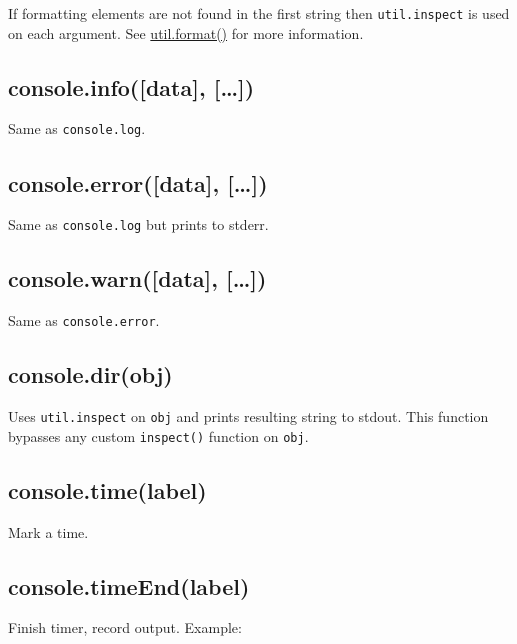 If formatting elements are not found in the first string then
\texttt{util.inspect} is used on each argument. See
\href{util.html\#util_util_format_format}{util.format()} for more
information.

\subsection{console.info({[}data{]},
{[}\ldots{}{]})}\label{console.infodata}

Same as \texttt{console.log}.

\subsection{console.error({[}data{]},
{[}\ldots{}{]})}\label{console.errordata}

Same as \texttt{console.log} but prints to stderr.

\subsection{console.warn({[}data{]},
{[}\ldots{}{]})}\label{console.warndata}

Same as \texttt{console.error}.

\subsection{console.dir(obj)}\label{console.dirobj}

Uses \texttt{util.inspect} on \texttt{obj} and prints resulting string
to stdout. This function bypasses any custom \texttt{inspect()} function
on \texttt{obj}.

\subsection{console.time(label)}\label{console.timelabel}

Mark a time.

\subsection{console.timeEnd(label)}\label{console.timeendlabel}

Finish timer, record output. Example:

\begin{Shaded}
\begin{Highlighting}[]
\NormalTok{(}\NormalTok{);}
 \NormalTok{(} 
  \NormalTok{;}
\NormalTok{\}}
\NormalTok{(}\NormalTok{);}
\end{Highlighting}
\end{Shaded}

